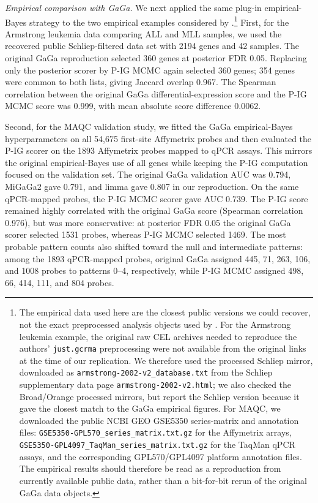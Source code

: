 \textit{Empirical comparison with GaGa.}
We next applied the same plug-in empirical-Bayes strategy to the two empirical
examples considered by \cite{Rossell2009GaGa}.\footnote{The empirical data used
here are the closest public versions we could recover, not the exact
preprocessed analysis objects used by \cite{Rossell2009GaGa}.  For the
Armstrong leukemia example, the original raw CEL archives needed to reproduce
the authors' \texttt{just.gcrma} preprocessing were not available from the
original links at the time of our replication.  We therefore used the processed
Schliep mirror, downloaded as \texttt{armstrong-2002-v2\_database.txt} from the
Schliep supplementary data page \texttt{armstrong-2002-v2.html}; we also checked
the Broad/Orange processed mirrors, but report the Schliep version because it
gave the closest match to the GaGa empirical figures.  For MAQC, we downloaded
the public NCBI GEO GSE5350 series-matrix and annotation files:
\texttt{GSE5350-GPL570\_series\_matrix.txt.gz} for the Affymetrix arrays,
\texttt{GSE5350-GPL4097\_TaqMan\_series\_matrix.txt.gz} for the TaqMan qPCR
assays, and the corresponding GPL570/GPL4097 platform annotation files.  The
empirical results should therefore be read as a reproduction from currently
available public data, rather than a bit-for-bit rerun of the original GaGa
data objects.}  First, for the Armstrong
leukemia data comparing ALL and MLL samples, we used the recovered public
Schliep-filtered data set with 2194 genes and 42 samples.  The original GaGa
reproduction selected 360 genes at posterior FDR 0.05.  Replacing only the
posterior scorer by P-IG MCMC again selected 360 genes; 354 genes were common
to both lists, giving Jaccard overlap 0.967.  The Spearman correlation between
the original GaGa differential-expression score and the P-IG MCMC score was
0.999, with mean absolute score difference 0.0062.

Second, for the MAQC validation study, we fitted the GaGa empirical-Bayes
hyperparameters on all 54,675 first-site Affymetrix probes and then evaluated
the P-IG scorer on the 1893 Affymetrix probes mapped to qPCR assays.  This
mirrors the original empirical-Bayes use of all genes while keeping the P-IG
computation focused on the validation set.  The original GaGa validation AUC
was 0.794, MiGaGa2 gave 0.791, and limma gave 0.807 in our reproduction.  On
the same qPCR-mapped probes, the P-IG MCMC scorer gave AUC 0.739.  The P-IG
score remained highly correlated with the original GaGa score
(Spearman correlation 0.976), but was more conservative: at posterior FDR 0.05
the original GaGa scorer selected 1531 probes, whereas P-IG MCMC selected 1469.
The most probable pattern counts also shifted toward the null and intermediate
patterns: among the 1893 qPCR-mapped probes, original GaGa assigned 445, 71,
263, 106, and 1008 probes to patterns 0--4, respectively, while P-IG MCMC
assigned 498, 66, 414, 111, and 804 probes.

